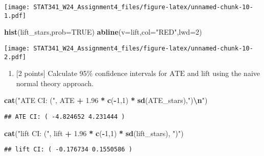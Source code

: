 \documentclass[
]{article}
\newenvironment{Shaded}{\begin{snugshade}}{\end{snugshade}}
\newcommand{\AttributeTok}[1]{\textcolor[rgb]{0.13,0.29,0.53}{#1}}
\newcommand{\ConstantTok}[1]{\textcolor[rgb]{0.56,0.35,0.01}{#1}}
\newcommand{\DecValTok}[1]{\textcolor[rgb]{0.00,0.00,0.81}{#1}}
\newcommand{\FloatTok}[1]{\textcolor[rgb]{0.00,0.00,0.81}{#1}}
\newcommand{\FunctionTok}[1]{\textcolor[rgb]{0.13,0.29,0.53}{\textbf{#1}}}
\newcommand{\NormalTok}[1]{#1}
\newcommand{\SpecialCharTok}[1]{\textcolor[rgb]{0.81,0.36,0.00}{\textbf{#1}}}
\newcommand{\StringTok}[1]{\textcolor[rgb]{0.31,0.60,0.02}{#1}}
\providecommand{\tightlist}{%
  \setlength{\itemsep}{0pt}\setlength{\parskip}{0pt}}
\begin{document}
\texttt{[image: STAT341\_W24\_Assignment4\_files/figure-latex/unnamed-chunk-10-1.pdf]}

\begin{Shaded}
\begin{Highlighting}[]
\FunctionTok{hist}\NormalTok{(lift\_stars,}\AttributeTok{prob=}\ConstantTok{TRUE}\NormalTok{)}
\FunctionTok{abline}\NormalTok{(}\AttributeTok{v=}\NormalTok{lift,}\AttributeTok{col=}\StringTok{"RED"}\NormalTok{,}\AttributeTok{lwd=}\DecValTok{2}\NormalTok{)}
\end{Highlighting}
\end{Shaded}

\texttt{[image: STAT341\_W24\_Assignment4\_files/figure-latex/unnamed-chunk-10-2.pdf]}

\begin{enumerate}
\def\labelenumi{(\alph{enumi})}
\setcounter{enumi}{4}
\tightlist
\item
  {[}2 points{]} Calculate 95\% confidence intervals for \(\text{ATE}\)
  and \(\text{lift}\) using the naive normal theory approach.
\end{enumerate}

\begin{Shaded}
\begin{Highlighting}[]
\FunctionTok{cat}\NormalTok{(}\StringTok{"ATE CI: ("}\NormalTok{, ATE }\SpecialCharTok{+} \FloatTok{1.96} \SpecialCharTok{*} \FunctionTok{c}\NormalTok{(}\SpecialCharTok{{-}}\DecValTok{1}\NormalTok{,}\DecValTok{1}\NormalTok{) }\SpecialCharTok{*} \FunctionTok{sd}\NormalTok{(ATE\_stars),}\StringTok{")}\SpecialCharTok{\textbackslash{}n}\StringTok{"}\NormalTok{)}
\end{Highlighting}
\end{Shaded}

\begin{verbatim}
## ATE CI: ( -4.824652 4.231444 )
\end{verbatim}

\begin{Shaded}
\begin{Highlighting}[]
\FunctionTok{cat}\NormalTok{(}\StringTok{"lift CI: ("}\NormalTok{, lift }\SpecialCharTok{+} \FloatTok{1.96} \SpecialCharTok{*} \FunctionTok{c}\NormalTok{(}\SpecialCharTok{{-}}\DecValTok{1}\NormalTok{,}\DecValTok{1}\NormalTok{) }\SpecialCharTok{*} \FunctionTok{sd}\NormalTok{(lift\_stars), }\StringTok{")"}\NormalTok{)}
\end{Highlighting}
\end{Shaded}

\begin{verbatim}
## lift CI: ( -0.176734 0.1550586 )
\end{verbatim}
\end{document}
